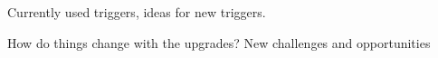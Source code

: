 Currently used triggers, ideas for new triggers.

How do things change with the upgrades? New challenges and opportunities
